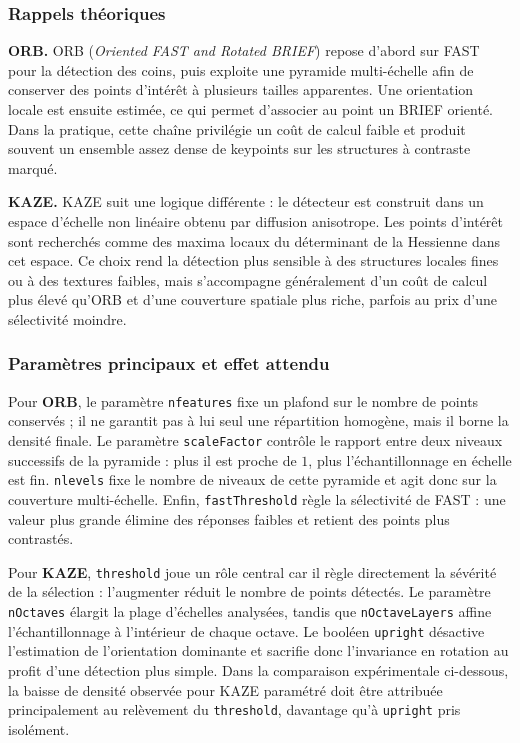 \documentclass[11pt,a4paper]{article}
\begin{document}
\subsubsection{Rappels théoriques}
\textbf{ORB.} ORB (\emph{Oriented FAST and Rotated BRIEF}) repose d'abord sur FAST pour la détection des coins, puis exploite une pyramide multi-échelle afin de conserver des points d'intérêt à plusieurs tailles apparentes. Une orientation locale est ensuite estimée, ce qui permet d'associer au point un BRIEF orienté. Dans la pratique, cette chaîne privilégie un coût de calcul faible et produit souvent un ensemble assez dense de keypoints sur les structures à contraste marqué.

\textbf{KAZE.} KAZE suit une logique différente : le détecteur est construit dans un espace d'échelle non linéaire obtenu par diffusion anisotrope. Les points d'intérêt sont recherchés comme des maxima locaux du déterminant de la Hessienne dans cet espace. Ce choix rend la détection plus sensible à des structures locales fines ou à des textures faibles, mais s'accompagne généralement d'un coût de calcul plus élevé qu'ORB et d'une couverture spatiale plus riche, parfois au prix d'une sélectivité moindre.

\subsubsection{Paramètres principaux et effet attendu}
Pour \textbf{ORB}, le paramètre \texttt{nfeatures} fixe un plafond sur le nombre de points conservés ; il ne garantit pas à lui seul une répartition homogène, mais il borne la densité finale. Le paramètre \texttt{scaleFactor} contrôle le rapport entre deux niveaux successifs de la pyramide : plus il est proche de \(1\), plus l'échantillonnage en échelle est fin. \texttt{nlevels} fixe le nombre de niveaux de cette pyramide et agit donc sur la couverture multi-échelle. Enfin, \texttt{fastThreshold} règle la sélectivité de FAST : une valeur plus grande élimine des réponses faibles et retient des points plus contrastés.

Pour \textbf{KAZE}, \texttt{threshold} joue un rôle central car il règle directement la sévérité de la sélection : l'augmenter réduit le nombre de points détectés. Le paramètre \texttt{nOctaves} élargit la plage d'échelles analysées, tandis que \texttt{nOctaveLayers} affine l'échantillonnage à l'intérieur de chaque octave. Le booléen \texttt{upright} désactive l'estimation de l'orientation dominante et sacrifie donc l'invariance en rotation au profit d'une détection plus simple. Dans la comparaison expérimentale ci-dessous, la baisse de densité observée pour KAZE paramétré doit être attribuée principalement au relèvement du \texttt{threshold}, davantage qu'à \texttt{upright} pris isolément.
\end{document}
